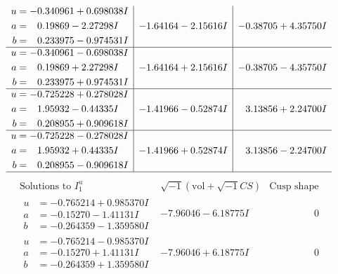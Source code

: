 \documentclass[1p]{elsarticle_modified}
\theoremstyle{definition}
\newcommand{\I}{\sqrt{-1}}
\begin{document}
$$\begin{array}{c|c|c}
\begin{aligned}
u &= -0.340961 + 0.698038 I \\
a &= \phantom{-}0.19869 - 2.27298 I \\
b &= \phantom{-}0.233975 - 0.974531 I\end{aligned}
 & -1.64164 - 2.15616 I & -0.38705 + 4.35750 I \\ \hline\begin{aligned}
u &= -0.340961 - 0.698038 I \\
a &= \phantom{-}0.19869 + 2.27298 I \\
b &= \phantom{-}0.233975 + 0.974531 I\end{aligned}
 & -1.64164 + 2.15616 I & -0.38705 - 4.35750 I \\ \hline\begin{aligned}
u &= -0.725228 + 0.278028 I \\
a &= \phantom{-}1.95932 - 0.44335 I \\
b &= \phantom{-}0.208955 + 0.909618 I\end{aligned}
 & -1.41966 - 0.52874 I & \phantom{-}3.13856 + 2.24700 I \\ \hline\begin{aligned}
u &= -0.725228 - 0.278028 I \\
a &= \phantom{-}1.95932 + 0.44335 I \\
b &= \phantom{-}0.208955 - 0.909618 I\end{aligned}
 & -1.41966 + 0.52874 I & \phantom{-}3.13856 - 2.24700 I\\
 \hline 
 \end{array}$$\newpage$$\begin{array}{c|c|c}  
\text{Solutions to }I^u_{1}& \I (\text{vol} + \sqrt{-1}CS) & \text{Cusp shape}\\
 \hline 
\begin{aligned}
u &= -0.765214 + 0.985370 I \\
a &= -0.15270 - 1.41131 I \\
b &= -0.264359 - 1.359580 I\end{aligned}
 & -7.96046 - 6.18775 I & \phantom{-0.000000 } 0 \\ \hline\begin{aligned}
u &= -0.765214 - 0.985370 I \\
a &= -0.15270 + 1.41131 I \\
b &= -0.264359 + 1.359580 I\end{aligned}
 & -7.96046 + 6.18775 I & \phantom{-0.000000 } 0 \\ \hline\begin{aligned}

\end{aligned}
\end{array}$$
\end{document}
